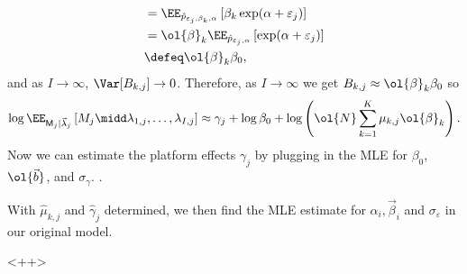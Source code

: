 \begin{enumerate}
\begin{align*}
        &= \EE_{\hat{p}_{\varepsilon_{j}, \beta_k, \alpha}}\left[ \beta_k \exp(\alpha+\varepsilon_j) \right]
        \\
        &= \ol{\beta}_k\EE_{\hat{p}_{\varepsilon_{j}, \alpha}}\left[ \exp(\alpha+\varepsilon_j) \right]
        \\
        &\defeq \ol{\beta}_k\beta_0,
    \end{align*}
    and as $I\to \infty$, $\Var[B_{k, j}] \to 0$.  Therefore, as $I \to \infty$ we get $B_{k, j} \approx \ol{\beta}_k \beta_0$ so
    \[
    \log \EE_{\mathsf{M}_j | \vec{\lambda}_j}\left[ M_j \midd  \lambda_{1, j}, \ldots, \lambda_{I, j} \right]
    \approx \gamma_j + \log \beta_0 + \log \left( \ol{N} \sum\limits_{k=1}^{K} \mu_{k, j}\ol{\beta}_k \right).
    \]
    Now we can estimate the platform effects $\gamma_j$ by plugging in the MLE for $\beta_0$, $\ol{\vec{b}}$, and $\sigma_\gamma$.
    \ii {}.

    With $\hat{\mu}_{k, j}$ and $\hat{\gamma}_j$ determined, we then find the MLE estimate for $\alpha_i, \vec{\beta}_i$ and $\sigma_\varepsilon$ in our original model.
\end{enumerate}<++>
